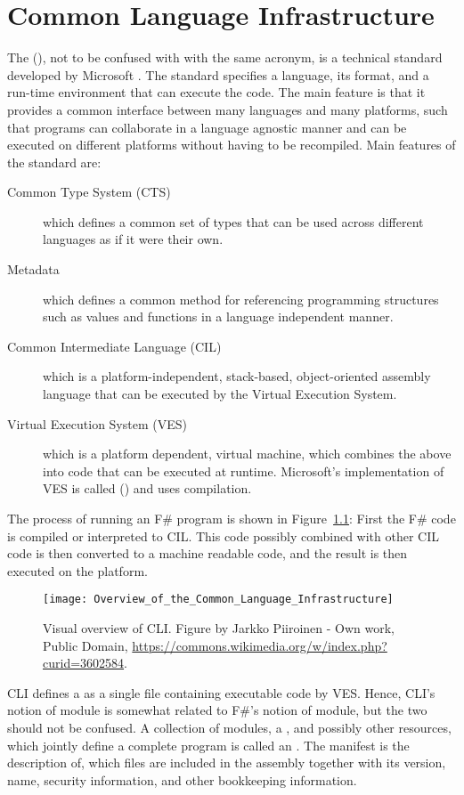 \chapter{Common Language Infrastructure}
\label{chap:cli} 
The  (), not to be confused with  with the same acronym, is a technical standard developed by Microsoft \cite{iso23271:2012, ecma335}. The standard specifies a language, its format, and a run-time environment that can execute the code. The main feature is that it provides a common interface between many languages and many platforms, such that programs can collaborate in a language agnostic manner and can be executed on different platforms without having to be recompiled. Main features of the standard are:
\begin{description}
\item[Common Type System (CTS)] which defines a common set of types that can be used across different languages as if it were their own.
\item[Metadata] which defines a common method for referencing programming structures such as values and functions in a language independent manner.
\item[Common Intermediate Language (CIL)] which is a platform-independent, stack-based, object-oriented assembly language that can be executed by the Virtual Execution System.
\item[Virtual Execution System (VES)] which is a platform dependent, virtual machine, which combines the above into code that can be executed at runtime. Microsoft's implementation of VES is called  () and uses  compilation.
\end{description}
The process of running an F\# program is shown in Figure~\ref{fig:cliOverview}: First the F\# code is compiled or interpreted to CIL. This code possibly combined with other CIL code is then converted to a machine readable code, and the result is then executed on the platform.
\begin{figure}
  \centering
  \texttt{[image: Overview\_of\_the\_Common\_Language\_Infrastructure]}
  \caption{Visual overview of CLI. Figure by Jarkko Piiroinen - Own work, Public Domain, \url{https://commons.wikimedia.org/w/index.php?curid=3602584}.}
  \label{fig:cliOverview}
\end{figure}

CLI defines a  as a single file containing executable code by VES. Hence, CLI's notion of module is somewhat related to F\#'s notion of module, but the two should not be confused. A collection of modules, a , and possibly other resources, which jointly define a complete program is called an . The manifest is the description of, which files are included in the assembly together with its version, name, security information, and other bookkeeping information.

